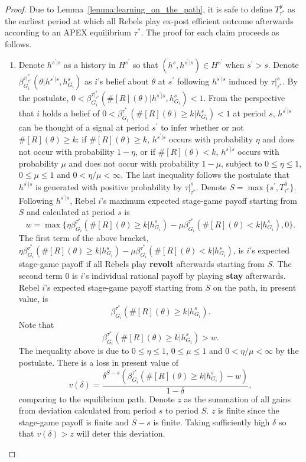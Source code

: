 \documentclass[12pt,letter]{article}
\theoremstyle{definition}
\theoremstyle{definition}
\theoremstyle{remark}
\theoremstyle{claim}
\begin{document}
\begin{proof}
Due to Lemma~\ref{lemma:learning_on_the_path}, it is safe to define $T^{\theta}_{\tau^{*}}$ as the earliest period at which all Rebels play ex-post efficient outcome afterwards according to an APEX equilibrium $\tau^{*}$. 
The proof for each claim proceeds as follows. 
\begin{enumerate}[label=(\arabic*)]
\item Denote $h^{s^{'}|s}$ as a history in $H^{s^{'}}$ so that $(h^s,h^{s^{'}|s})\in H^{s^{'}}$ when $s^{'}>s$. Denote $\beta^{\tau|^s_{\tau^{*}}}_{G_i}(\theta|h^{s^{'}|s}, h^s_{G_i})$ as $i$'s belief about $\theta$ at $s^{'}$ following $h^{s^{'}|s}$ induced by $\tau|^s_{\tau^{*}}$. By the postulate,  $0<\beta^{\tau|^s_{\tau^{*}}}_{G_i}(\#[R](\theta)|h^{s^{'}|s}, h^s_{G_i})<1$. From the perspective that $i$ holds a belief of $0<\beta^{\tau^{*}}_{G_i}(\#[R](\theta)\geq k|h^s_{G_i})<1$ at period $s$, $h^{s^{'}|s}$ can be thought of a signal at period $s^{'}$ to infer whether or not $\#[R](\theta)\geq k$: if $\#[R](\theta)\geq k$, $h^{s^{'}|s}$ occurs with probability $\eta$ and does not occur with probability $1-\eta$, or if $\#[R](\theta)< k$, $h^{s^{'}|s}$ occurs with probability $\mu$ and does not occur with probability $1-\mu$, subject to $0\leq \eta \leq 1$, $0\leq\mu\leq 1$ and $0<\eta/\mu<\infty$. The last inequality follows the postulate that $h^{s^{'}|s}$ is generated with positive probability by $\tau|^s_{\tau^{*}}$. Denote $S=\max\{s^{'}, T^{\theta}_{\tau^{*}}\}$. Following $h^{s^{'}|s}$, Rebel $i$'s maximum expected stage-game payoff starting from $S$ and calculated at period $s$ is 
\[w=\max\{\eta\beta^{\tau^{*}}_{G_i}(\#[R](\theta)\geq k|h^s_{G_i})-\mu\beta^{\tau^{*}}_{G_i}(\#[R](\theta)< k|h^s_{G_i}),0\}.\]
The first term of the above bracket, $\eta\beta^{\tau^{*}}_{G_i}(\#[R](\theta)\geq k|h^s_{G_i})-\mu\beta^{\tau^{*}}_{G_i}(\#[R](\theta)< k|h^s_{G_i})$, is $i$'s expected stage-game payoff if all Rebels play \textbf{revolt} afterwards starting from $S$.  The second term $0$ is $i$'s individual rational payoff by playing \textbf{stay} afterwards. Rebel $i$'s expected stage-game payoff starting from $S$ on the path, in present value, is 
\[\beta^{\tau^{*}}_{G_i}(\#[R](\theta)\geq k|h^s_{G_i}).\] 
Note that
\[\beta^{\tau^{*}}_{G_i}(\#[R](\theta)\geq k|h^s_{G_i})>w.\]
The inequality above is due to $0\leq \eta \leq 1$, $0\leq\mu\leq 1$ and $0<\eta/\mu<\infty$ by the postulate. There is a loss in present value of
\[v(\delta)=\frac{\delta^{S-s}(\beta^{\tau^{*}}_{G_i}(\#[R](\theta)\geq k|h^s_{G_i})-w)}{1-\delta},\]
comparing to the equilibrium path. Denote $z$ as the summation of all gains from deviation calculated from period $s$ to period $S$. $z$ is finite since the stage-game payoff is finite and $S-s$ is finite. Taking sufficiently high $\delta$ so that $v(\delta)>z$ will deter this deviation.


\end{enumerate}
\end{proof}
\end{document}
